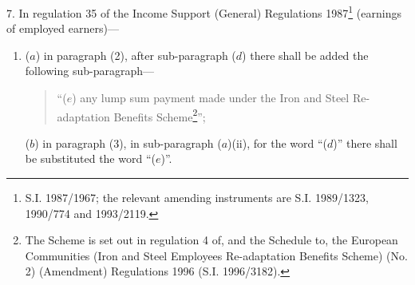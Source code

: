 \documentclass[12pt,a4paper]{article}
\begin{document}
7.  In regulation 35 of the Income Support (General) Regulations 1987\footnote{\frenchspacing S.I. 1987/1967; the relevant amending instruments are S.I. 1989/1323, 1990/774 and 1993/2119.} (earnings of employed earners)—
\begin{enumerate}\item[]
($a$) in paragraph (2), after sub-paragraph ($d$)  there shall be added the following sub-paragraph—
\begin{quotation}
“($e$) any lump sum payment made under the Iron and Steel Re-adaptation Benefits Scheme\footnote{\frenchspacing The Scheme is set out in regulation 4 of, and the Schedule to, the European Communities (Iron and Steel Employees Re-adaptation Benefits Scheme) (No. 2) (Amendment) Regulations 1996 (S.I. 1996/3182).}”;
\end{quotation}

($b$) in paragraph (3), in sub-paragraph ($a$)(ii), for the word “($d$)” there shall be substituted the word “($e$)”.
\end{enumerate}
\end{document}
